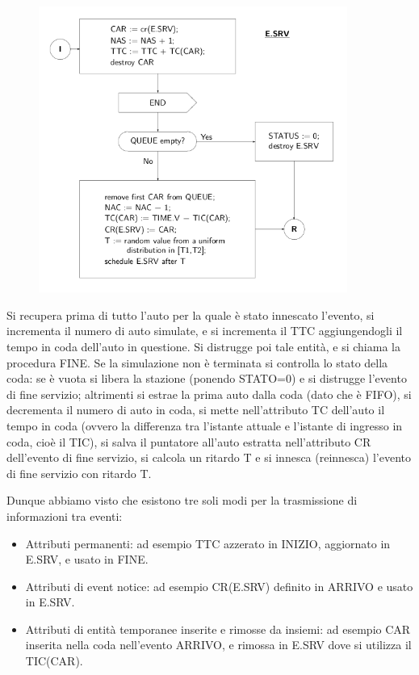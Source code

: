 \documentclass[11pt]{book}
\begin{document}
\begin{figure}[H]
  \centering
  \includegraphics[width=0.9\textwidth]{images/cap11fig39.png}
\end{figure}

Si recupera prima di tutto l'auto per la quale \`e stato innescato
l'evento, si incrementa il numero di auto simulate, e si incrementa il
TTC aggiungendogli il tempo in coda dell'auto in questione. Si
distrugge poi tale entit\`a, e si chiama la procedura FINE. Se la
simulazione non \`e terminata si controlla lo stato della coda: se \`e
vuota si libera la stazione (ponendo STATO=0) e si distrugge l'evento
di fine servizio; altrimenti si estrae la prima auto dalla coda (dato
che \`e FIFO), si decrementa il numero di auto in coda, si mette
nell'attributo TC dell'auto il tempo in coda (ovvero la differenza tra
l'istante attuale e l'istante di ingresso in coda, cio\`e il TIC), si
salva il puntatore all'auto estratta nell'attributo CR dell'evento di
fine servizio, si calcola un ritardo T e si innesca (reinnesca)
l'evento di fine servizio con ritardo T.

\par\bigskip
Dunque abbiamo visto che esistono tre soli modi per la trasmissione di
informazioni tra eventi:

\begin{itemize}
\item Attributi permanenti: ad esempio TTC azzerato in INIZIO,
  aggiornato in E.SRV, e usato in FINE.
\item Attributi di event notice: ad esempio CR(E.SRV) definito in
  ARRIVO e usato in E.SRV.
\item Attributi di entit\`a temporanee inserite e rimosse da insiemi:
  ad esempio CAR inserita nella coda nell'evento ARRIVO, e rimossa in
  E.SRV dove si utilizza il TIC(CAR).
\end{itemize}
\end{document}
